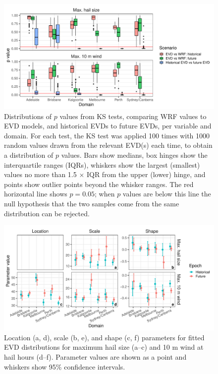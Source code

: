 \documentclass[draft,grl]{agutexSI2019}\usepackage[]{graphicx}\usepackage[]{xcolor}
\begin{document}
\begin{article}
\begin{figure}[!ht]
    \includegraphics[width=\textwidth]{figures/fit_pvals}
    \caption{Distributions of $p$ values from KS tests, comparing WRF
     values to EVD models, and historical EVDs to future EVDs, per variable and
     domain. For each test, the KS test was applied 100 times with 1000 random
     values drawn from the relevant EVD(s) each time, to obtain a
     distribution of $p$ values. Bars show medians, box hinges show the
     interquartile ranges (IQRs), whiskers show the largest (smallest) values no
     more than 1.5 $\times$ IQR from the upper (lower) hinge, and points show
     outlier points beyond the whisker ranges. The red horizontal line shows $p
     = 0.05$; when $p$ values are below this line the null hypothesis that the
     two samples come from the same distribution can be rejected.}
    \label{fig:ks_pvals}
\end{figure}

\begin{figure}[!ht]
    \includegraphics[width=\textwidth]{figures/fit_params}
    \caption{Location (a, d), scale (b, e), and shape (c, f) parameters for
    fitted EVD distributions for maximum hail size (a--c) and 10 m wind at
    hail hours (d--f). Parameter values are shown as a point and whiskers show
    95\% confidence intervals.}
    \label{fig:evd_parameters}
\end{figure}


\end{article}
\end{document}
